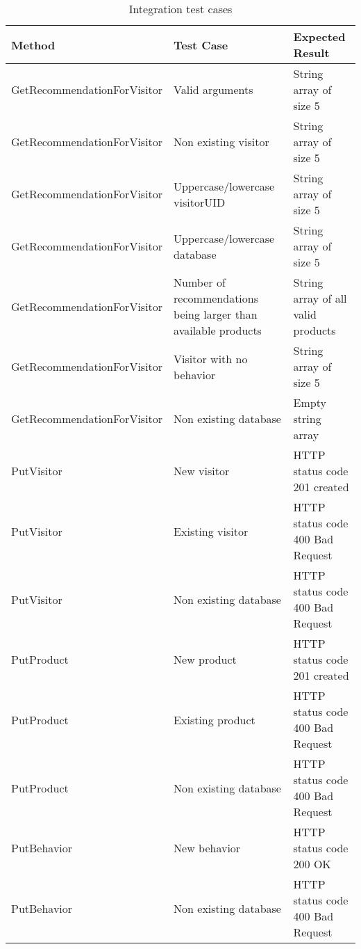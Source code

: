 \begin{table}[H]
\centering
\caption{Integration test cases}
\label{testCases}
\begin{tabular}{|p{6cm}|p{5cm}|p{5cm}|}
\hline
\textbf{Method}             & \textbf{Test Case}                                             & \textbf{Expected Result}           \\ \hline
GetRecommendationForVisitor & Valid arguments                                                & String array of size 5             \\ \hline
GetRecommendationForVisitor & Non existing visitor                                           & String array of size 5             \\ \hline
GetRecommendationForVisitor & Uppercase/lowercase visitorUID                                 & String array of size 5             \\ \hline
GetRecommendationForVisitor & Uppercase/lowercase database                                   & String array of size 5             \\ \hline
GetRecommendationForVisitor & Number of recommendations being larger than available products & String array of all valid products \\ \hline
GetRecommendationForVisitor & Visitor with no behavior                                       & String array of size 5             \\ \hline
GetRecommendationForVisitor & Non existing database                                          & Empty string array                 \\ \hline
PutVisitor                  & New visitor                                                    & HTTP status code 201 created         \\ \hline
PutVisitor                  & Existing visitor                                               & HTTP status code 400 Bad Request            \\ \hline
PutVisitor                  & Non existing database                                          & HTTP status code 400 Bad Request            \\ \hline
PutProduct                  & New product                                                    & HTTP status code 201 created         \\ \hline
PutProduct                  & Existing product                                               & HTTP status code 400 Bad Request            \\ \hline
PutProduct                  & Non existing database                                          & HTTP status code 400 Bad Request           \\ \hline
PutBehavior                 & New behavior                                                   & HTTP status code 200 OK         \\ \hline
PutBehavior                 & Non existing database                                          & HTTP status code 400 Bad Request          \\ \hline
\end{tabular}
\end{table}

